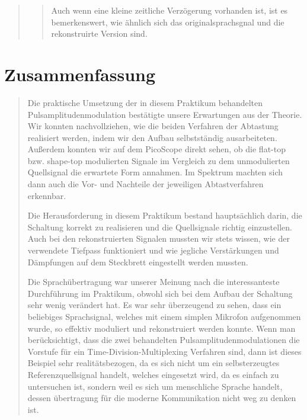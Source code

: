 \begin{quote}
\begin{quote}
            Auch wenn eine kleine zeitliche Verzögerung vorhanden ist, ist es
            bemerkenswert, wie ähnlich sich das originalsprachsgnal und die
            rekonstruirte Version sind. 
            
            \end{quote}  %
       	
       	
         	
    \end{quote}%
    
    \section{Zusammenfassung}
    \begin{quote}
	
    	Die praktische Umsetzung der in diesem Praktikum behandelten
    	Pulsamplitudenmodulation bestätigte unsere Erwartungen aus der Theorie. Wir
    	konnten nachvollziehen, wie die beiden Verfahren der Abtastung realisiert
    	werden, indem wir den Aufbau selbstständig ausarbeiteten. Außerdem konnten wir
    	auf dem PicoScope direkt sehen, ob die flat-top bzw. shape-top modulierten
    	Signale im Vergleich zu dem unmodulierten Quellsignal die erwartete Form
    	annahmen. Im Spektrum machten sich dann auch die Vor- und Nachteile der
    	jeweiligen Abtastverfahren erkennbar.
    	
    	\vspace{0.5em}
    	
    	Die Herausforderung in diesem Praktikum bestand hauptsächlich darin, die
    	Schaltung korrekt zu realisieren und die Quellsignale richtig einzustellen.
    	Auch bei den rekonstruierten Signalen mussten wir stets wissen, wie der verwendete 
    	Tiefpass funktioniert und wie jegliche Verstärkungen und Dämpfungen auf dem
    	Steckbrett eingestellt werden mussten.
    	
    	\vspace{0.5em}
    	
    	Die Sprachübertragung war unserer Meinung nach die interessanteste Durchführung
    	im Praktikum, obwohl sich bei dem Aufbau der Schaltung sehr wenig verändert
    	hat. Es war sehr überzeugend zu sehen, dass ein beliebiges Sprachsignal,
    	welches mit einem simplen Mikrofon aufgenommen wurde, so effektiv
    	moduliert und rekonstruiert werden konnte. Wenn man berücksichtigt, dass die
    	zwei behandelten Pulsamplitudenmodulationen die Vorstufe für ein Time-Division-Multiplexing
    	Verfahren sind, dann ist dieses Beispiel sehr realitätsbezogen, da es sich
    	nicht um ein selbsterzeugtes Referenzquellsignal handelt, welches
    	eingesetzt wird, da es einfach zu untersuchen ist, sondern weil es sich um
    	menschliche Sprache handelt, dessen übertragung für die moderne Kommunikation  
    	nicht weg zu denken ist.
	

    \end{quote}%
         

